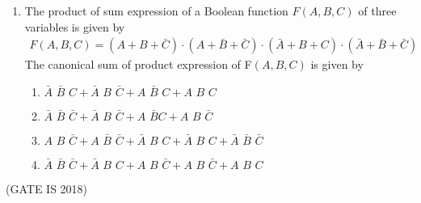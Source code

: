 \documentclass{article}
\providecommand{\brak}[1]{\ensuremath{\left(#1\right)}}
\begin{document}
\begin{enumerate}
\item The product of sum expression of a Boolean function $F\brak{A,B,C}$ of three variables is given by
\begin{align*}
F\brak{A,B,C} = \brak{A + B + \bar{C}}\cdot\brak{A + \bar{B} +\bar{C}}\cdot\brak{\bar{A} + B + C}\cdot\brak{\bar{A} + \bar{B} + \bar{C}}
\end{align*}
The canonical sum of product expression of F\brak{A,B,C} is  given by
  \begin{enumerate}[label=(\Alph*)]                               
	  \item $\bar{A}\hspace{4pt}\bar{B}\hspace{4pt}C+ \bar{A}\hspace{4pt}B\hspace{4pt}\bar{C} + A\hspace{4pt}\bar{B}\hspace{4pt}C + A\hspace{4pt}B\hspace{4pt}C$
	  \item $\bar{A}\hspace{4pt}\bar{B}\hspace{4pt}\bar{C} + \bar{A}\hspace{4pt}B\hspace{4pt}\bar{C} + A\hspace{4pt}\bar{B} C + A\hspace{4pt}B\hspace{4pt}\bar{C}$
	  \item $A\hspace{4pt}B\hspace{4pt} \bar{C} + A\hspace{4pt}\bar{B}\hspace{4pt}\bar{C} + \bar{A}\hspace{4pt}B\hspace{4pt}C + \bar{A}\hspace{4pt}B\hspace{4pt}C + \bar{A}\hspace{4pt}\bar{B}\hspace{4pt}\bar{C}$
	  \item $\bar{A}\hspace{4pt}\bar{B}\hspace{4pt}\bar{C} + \bar{A}\hspace{4pt}B\hspace{4pt}C +A\hspace{4pt}B\hspace{4pt}\bar{C} + A\hspace{4pt}B\hspace{4pt}\bar{C}+ A\hspace{4pt}B\hspace{4pt}C$
\end{enumerate}
\end{enumerate}
\hfill (GATE IS 2018)
\end{document}
